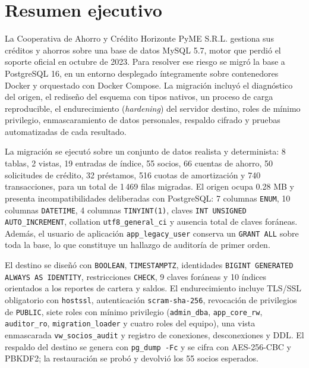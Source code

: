 
\section{Resumen ejecutivo}

La Cooperativa de Ahorro y Crédito Horizonte PyME S.R.L. gestiona sus créditos
y ahorros sobre una base de datos MySQL 5.7, motor que perdió el soporte
oficial en octubre de 2023. Para resolver ese riesgo se migró la base a
PostgreSQL 16, en un entorno desplegado íntegramente sobre contenedores Docker
y orquestado con Docker Compose. La migración incluyó el diagnóstico del
origen, el rediseño del esquema con tipos nativos, un proceso de carga
reproducible, el endurecimiento (\emph{hardening}) del servidor destino, roles
de mínimo privilegio, enmascaramiento de datos personales, respaldo cifrado y
pruebas automatizadas de cada resultado.

La migración se ejecutó sobre un conjunto de datos realista y determinista:
8 tablas, 2 vistas, 19 entradas de índice, 55 socios, 66 cuentas de ahorro,
50 solicitudes de crédito, 32 préstamos, 516 cuotas de amortización y 740
transacciones, para un total de 1\,469 filas migradas. El origen ocupa
0.28 MB y presenta incompatibilidades deliberadas con PostgreSQL: 7 columnas
\texttt{ENUM}, 10 columnas \texttt{DATETIME}, 4 columnas \texttt{TINYINT(1)},
claves \texttt{INT UNSIGNED AUTO\_INCREMENT}, collation \texttt{utf8\_general\_ci}
y ausencia total de claves foráneas. Además, el usuario de aplicación
\texttt{app\_legacy\_user} conserva un \texttt{GRANT ALL} sobre toda la base,
lo que constituye un hallazgo de auditoría de primer orden.

El destino se diseñó con \texttt{BOOLEAN}, \texttt{TIMESTAMPTZ},
identidades \texttt{BIGINT GENERATED ALWAYS AS IDENTITY}, restricciones
\texttt{CHECK}, 9 claves foráneas y 10 índices orientados a los reportes de
cartera y saldos. El endurecimiento incluye TLS/SSL obligatorio con
\texttt{hostssl}, autenticación \texttt{scram-sha-256}, revocación de
privilegios de \texttt{PUBLIC}, siete roles con mínimo privilegio
(\texttt{admin\_dba}, \texttt{app\_core\_rw}, \texttt{auditor\_ro},
\texttt{migration\_loader} y cuatro roles del equipo), una vista enmascarada
\texttt{vw\_socios\_audit} y registro de conexiones, desconexiones y DDL.
El respaldo del destino se genera con \texttt{pg\_dump -Fc} y se cifra con
AES-256-CBC y PBKDF2; la restauración se probó y devolvió los 55 socios
esperados.

